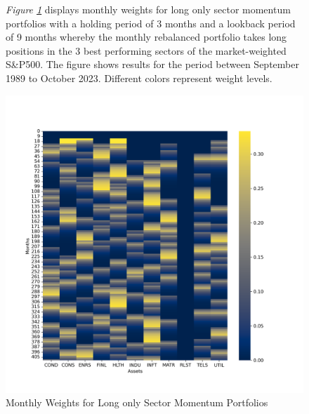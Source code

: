\documentclass[a4paper,12pt,twoside]{article}
\begin{document}
\begin{figure}[H]
           \captionsetup{justification=centering}
   \caption{Monthly Weights for Long only Sector Momentum Portfolios}
    \label{fig_10}
    \textit{Figure \ref{fig_10}} displays monthly weights for  long only sector momentum portfolios with a holding period of 3 months and a lookback period of 9 months whereby the monthly rebalanced portfolio takes long positions in the 3 best performing sectors of the market-weighted S\&P500. The figure shows results for the period between September 1989 to October 2023. Different colors  represent weight levels.
    \centerline{\includegraphics[width=1\textwidth]{Plots/strategy_weights_long_Sectors.png}}
\end{figure} 
\end{document}
